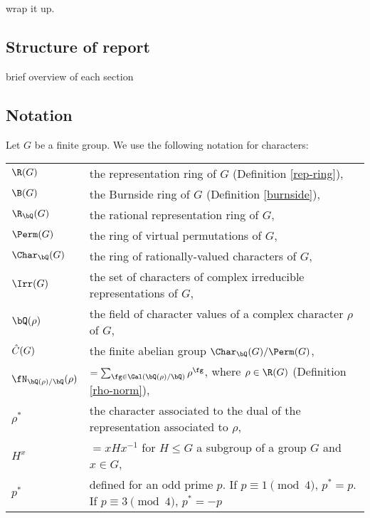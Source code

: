 {\color{red} wrap it up.}


\subsection*{Structure of report}

{\color{red} brief overview of each section}



\subsection*{Notation}
Let $G$ be a finite group. We use the following notation for characters:

\bigskip

\begin{tabular}{l | l}
     $\R(G)$ & the representation ring of $G$ (Definition \ref{rep-ring}), \\
     $\B(G)$ & the Burnside ring of $G$ (Definition \ref{burnside}), \\
    $\R_{\bQ}(G)$ & the rational representation ring of $G$, \\
    $\Perm(G)$ & the ring of virtual permutations of $G$, \\
    $\Char_{\bQ}(G)$ & the ring of rationally-valued characters of $G$,\\
    $\Irr(G)$ & the set of characters of complex irreducible representations of $G$, \\
    $\bQ(\rho)$ & the field of character values of a complex character $\rho$ of $G$, \\
    $\hat{C}(G)$ & the finite abelian group $\Char_{\bQ}(G) / \Perm(G)$, \\ 
    $\repnorm{\rho}$ &  $ = \sum_{\fg \in \Gal(\bQ(\rho) / \bQ)} \rho^{\fg}$, where $\rho \in \R(G)$ (Definition \ref{rho-norm}),\\
    $\rho^*$ & the character associated to the dual of the representation associated to $\rho$,
    \\
    $H^{x}$ & $= xHx^{-1}$  for $H \leq G$ a subgroup of a group $G$ and $x \in G$,\\
    $p^*$ & defined for an odd prime $p$. If $p \equiv 1 \pmod 4$, $p^* = p$. If $p \equiv 3 \pmod 4$, $p^* = -p$
\end{tabular}
\vspace{2em}

